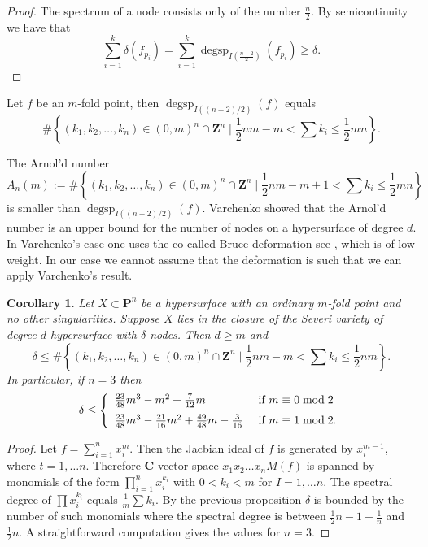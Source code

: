 \documentclass{amsart}
\newcommand{\Ps}{\mathbf{P}}
\newcommand{\C}{\mathbf{C}}
\newcommand{\Z}{\mathbf{Z}}
\newtheorem{corollary}[lemma]{Corollary}
\theoremstyle{definition}
\theoremstyle{remark}
\DeclareMathOperator{\degsp}{degsp}
\begin{document}
\begin{proof} The spectrum of a node consists only of  the number $\frac{n}{2}$. By semicontinuity  \cite{SteSC} we have that 
\[  \sum_{i=1}^k \delta(f_{p_i})= \sum_{i=1}^k  \degsp_{I(\frac{n-2}{2})}(f_{p_i})\geq \delta.\]
\end{proof}

Let $f$ be an $m$-fold point, then $\degsp_{I((n-2)/2)}(f)$ equals
\[ \# \left\{ (k_1,k_2,\dots,k_n) \in (0,m)^n \cap \Z^n \mid \frac{1}{2}nm-m<\sum k_i \leq \frac{1}{2}mn \right\}. \]

The Arnol'd number
\[ A_n(m):=  \# \left\{ (k_1,k_2,\dots,k_n) \in (0,m)^n \cap \Z^n \mid \frac{1}{2}nm-m+1<\sum k_i \leq \frac{1}{2}mn \right\} \]
is smaller than $\degsp_{I((n-2)/2)}(f)$. Varchenko \cite{VarSC} showed that the Arnol'd number is an upper  bound for the number of nodes on a hypersurface of degree $d$. In Varchenko's case one uses the co-called Bruce deformation see \cite[Section 5.4]{DucoNotes}, which is of low weight. In our case we cannot assume that the deformation is such that we can apply Varchenko's result.

\begin{corollary}\label{corSpec}
Let $X\subset \Ps^n$ be a hypersurface with an ordinary $m$-fold point and no other singularities. Suppose $X$ lies in the closure of the Severi variety of degree $d$ hypersurface with $\delta$ nodes. Then $d\geq m$ and 
\[ \delta \leq  \# \left\{ (k_1,k_2,\dots,k_n) \in (0,m)^n \cap \Z^n \mid \frac{1}{2}nm-m<\sum k_i \leq \frac{1}{2}nm \right\}. \]
In particular, if $n=3$ then 
\[ \delta\leq \left\{
\begin{array}{ll}
\frac{23}{48}m^3-m^2+\frac{7}{12} m &\mbox{ if } m\equiv 0\bmod 2\vspace{0.2cm}\\
\frac{23}{48}m^3-\frac{21}{16}m^2+\frac{49}{48}m-\frac{3}{16} &\mbox{ if } m\equiv 1 \bmod 2.\end{array}\right.\]
\end{corollary}

\begin{proof}
Let $f=\sum_{i=1}^n x_i^m$. Then the Jacbian ideal of $f$ is generated by $x_i^{m-1}$, where $t=1,\dots n$. Therefore  $\C$-vector space $x_1x_2\dots x_n M(f)$ is spanned by monomials of the form $\prod_{i=1}^n x_i^{k_i}$ with $0<k_i<m$ for $I=1,\dots n$.
The spectral degree of $\prod x_i^{k_i}$ equals $\frac{1}{m}\sum k_i$. By the previous proposition $\delta$ is bounded by the number of such monomials where the spectral degree is between $\frac{1}{2}n-1+\frac{1}{n}$ and $\frac{1}{2}n$. A straightforward computation gives the values for $n=3$.
\end{proof}
\end{document}
